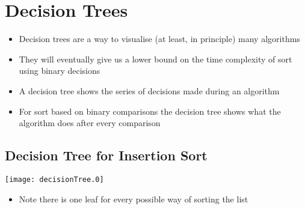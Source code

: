 \begin{slide}
\section{Decision Trees}

\begin{PauseHighLight}
  \begin{itemize}
  \item Decision trees are a way to visualise (at least, in principle)
    many algorithms\pause
  \item They will eventually give us a lower bound on the time
    complexity of sort using binary decisions\pause
  \item A decision tree shows the series of decisions made during an
    algorithm\pause
  \item For sort based on binary comparisons the decision tree shows
    what the algorithm does after every comparison\pause
  \end{itemize}
\end{PauseHighLight}


\begin{slide}
\section{Decision Tree for Insertion Sort}

\begin{center}
  \texttt{[image: decisionTree.0]}\pause
\end{center}
\begin{PauseHighLight}
  \begin{itemize}
  \item Note there is one leaf for every possible way of sorting the list\pause
  \end{itemize}
\end{PauseHighLight}

\end{slide}

\end{slide}


